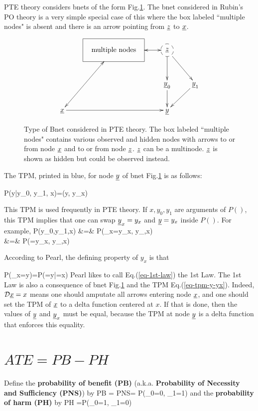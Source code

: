 PTE theory considers bnets of the form
Fig.\ref{fig-pte-bnet}.
The bnet considered in Rubin's
PO theory
is a very simple special case
of this where the box
labeled ``multiple nodes"
is absent and there is an
arrow pointing
from ${\underline{z}}$ to ${\underline{x}}$.


\begin{figure}[h!]
$$
\xymatrix{
&*++++[F]{\text{multiple nodes}}\ar@{<->}[ldd]
\ar@{<->}[r]
&*++[F-o]{\rvz}\ar[rd]\ar[d]
\\
&&\rvy_0\ar[d]
&\rvy_1\ar[ld]
\\
\rvx\ar[rr]
&&\rvy
}$$
\caption{Type of Bnet
considered in PTE theory.
The box labeled ``multiple nodes"
contains various observed
and hidden nodes with
arrows
to or from node ${\underline{x}}$
and to or from
node ${\underline{z}}$.
${\underline{z}}$ can be a multinode.
${\underline{z}}$
is shown
as hidden but
could be observed instead.
}
\label{fig-pte-bnet}
\end{figure}

The TPM, printed in blue,
 for node ${\underline{y}}$
of bnet Fig.\ref{fig-pte-bnet}
is as follows:


\beq\color{blue}
P(y|y_0, y_1, x)=\delta(y, y_x)
\label{eq-tpm-y-yx}
\eeq

This TPM is used
frequently
in PTE theory.  If $x,y_0, y_1$
are arguments
of $P()$, this TPM implies that one
can swap
${\underline{y}}_x=y_x$
and ${\underline{y}}=y_x$
inside $P()$. For example,
\beqa
P(y_0,y_1,x)
&=&
P({\color{red}\rvy_x}=y_x,
 y_{},x)
\\
&=&
P({\color{red}\rvy}=y_x,
 y_{},x)
\eeqa

According to Pearl, the defining
property of $y_x$ is that


\beq
P(\rvy_x=y)=P(\rvy=y|\cald\rvx=x)
\label{eq-1st-law}
\eeq
Pearl likes to call
Eq.(\ref{eq-1st-law})
the 1st Law. The 1st Law is also a
consequence of bnet Fig.\ref{fig-pte-bnet}
and the TPM Eq.(\ref{eq-tpm-y-yx}).
Indeed,
${\cal D}{\underline{x}}=x$
means one should amputate
all arrows entering
node ${\underline{x}}$, and one should set
the TPM of ${\underline{x}}$ to a delta
function centered at $x$.
If that is done, then
the values
of ${\underline{y}}$ and ${\underline{y}}_x$ must
be equal,
because the TPM at node ${\underline{y}}$
is a delta function that
enforces this equality.

\section{$ATE = PB - PH$}

Define the {\bf probability of benefit (PB)}
 (a.k.a. {\bf Probability of Necessity and Sufficiency (PNS)}) by
\beq
PB = PNS= P(\rvy_0=0, \rvy_1=1)
\eeq
and the {\bf probability of harm (PH)} by
\beq
PH =P(\rvy_0=1, \rvy_1=0)
\eeq


